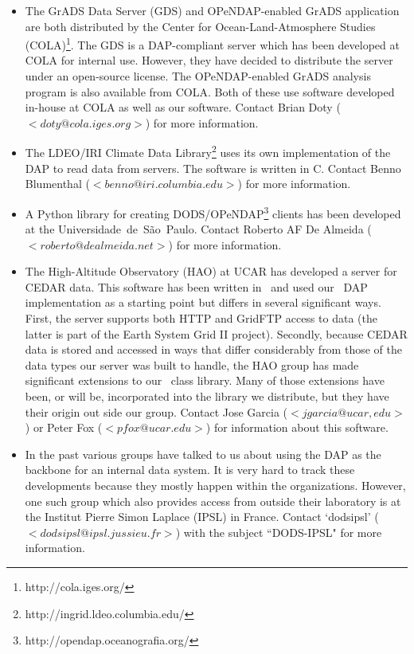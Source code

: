\documentclass[justify]{dods-paper}
\begin{document}
\begin{itemize}
\item The GrADS Data Server (GDS) and OPeNDAP-enabled GrADS application are
  both distributed by the Center for Ocean-Land-Atmosphere Studies
  (COLA)\footnote{http://cola.iges.org/}. The GDS is a DAP-compliant server
  which has been developed at COLA for internal use. However, they have
  decided to distribute the server under an open-source license. The
  OPeNDAP-enabled GrADS analysis program is also available from COLA. Both of
  these use software developed in-house at COLA as well as our software.
  Contact Brian Doty ($<doty@cola.iges.org>$) for more information.

\item The LDEO/IRI Climate Data
  Library\footnote{http://ingrid.ldeo.columbia.edu/} uses its own
  implementation of the DAP to read data from servers. The software is
  written in C. Contact Benno Blumenthal ($<benno@iri.columbia.edu>$) for
  more information.

\item A Python library for creating
  DODS/OPeNDAP\footnote{http://opendap.oceanografia.org/} clients has been
  developed at the Universidade~de~S\~ao~Paulo. Contact Roberto AF De Almeida
  ($<roberto@dealmeida.net>$) for more information.

\item The High-Altitude Observatory (HAO) at UCAR has developed a server for
  CEDAR data. This software has been written in \Cpp\ and used our \Cpp\ DAP
  implementation as a starting point but differs in several significant ways.
  First, the server supports both HTTP and GridFTP access to data (the latter
  is part of the Earth System Grid II project). Secondly, because CEDAR data
  is stored and accessed in ways that differ considerably from those of the
  data types our server was built to handle, the HAO group has made
  significant extensions to our \Cpp\ class library. Many of those extensions
  have been, or will be, incorporated into the library we distribute, but
  they have their origin out side our group. Contact Jose Garcia
  ($<jgarcia@ucar,edu>$) or Peter Fox ($<pfox@ucar.edu>$) for information
  about this software.

\item In the past various groups have talked to us about using the DAP as the
  backbone for an internal data system. It is very hard to track these
  developments because they mostly happen within the organizations. However,
  one such group which also provides access from outside their laboratory is
  at the Institut Pierre Simon Laplace (IPSL) in France. Contact `dodsipsl'
  ($<dodsipsl@ipsl.jussieu.fr>$) with the subject ``DODS-IPSL" for more
  information.

\end{itemize}
\end{document}

